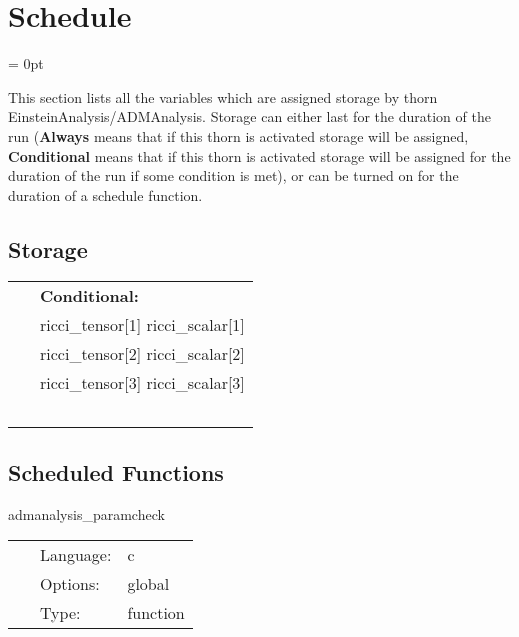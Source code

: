 
\section{Schedule} 


\parskip = 0pt


\noindent This section lists all the variables which are assigned storage by thorn EinsteinAnalysis/ADMAnalysis.  Storage can either last for the duration of the run ({\bf Always} means that if this thorn is activated storage will be assigned, {\bf Conditional} means that if this thorn is activated storage will be assigned for the duration of the run if some condition is met), or can be turned on for the duration of a schedule function.


\subsection*{Storage}

\hspace{5mm}

 \begin{tabular*}{160mm}{ll} 
~& {\bf Conditional:} \\ 
~ &  ricci\_tensor[1] ricci\_scalar[1]\\ 
~ &  ricci\_tensor[2] ricci\_scalar[2]\\ 
~ &  ricci\_tensor[3] ricci\_scalar[3]\\ 
~ & ~\\ 
\end{tabular*} 


\subsection*{Scheduled Functions}
\vspace{5mm}


\hspace{5mm} admanalysis\_paramcheck 

\hspace{5mm}{\it check that the metric\_type is recognised } 


\hspace{5mm}

 \begin{tabular*}{160mm}{cll} 
~ & Language:  & c \\ 
~ & Options:  & global \\ 
~ & Type:  & function \\ 
\end{tabular*} 


